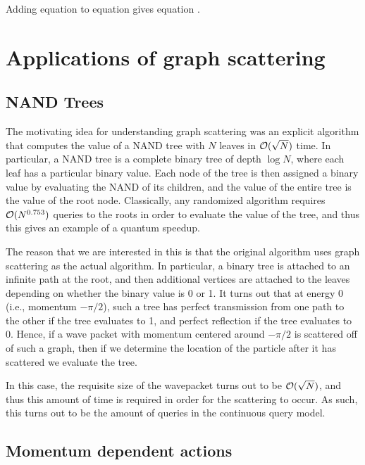 \documentclass[../thesis-main/thesis-main]{subfiles}
\begin{document}
 Adding equation  to equation  gives
equation .


\section{Applications of graph scattering}

\subsection{NAND Trees}

The motivating idea for understanding graph scattering was an explicit algorithm that computes the value of a NAND tree with $N$ leaves in $\mathcal{O}(\sqrt{N})$ time.  In particular, a NAND tree is a complete binary tree of depth $\log N$, where each leaf has a particular binary value.  Each node of the tree is then assigned a binary value by evaluating the NAND of its children, and the value of the entire tree is the value of the root node.  Classically, any randomized algorithm requires $\mathcal{O}(N^{0.753})$ queries to the roots in order to evaluate the value of the tree, and thus this gives an example of a quantum speedup.

The reason that we are interested in this is that the original algorithm uses graph scattering as the actual algorithm.  In particular, a binary tree is attached to an infinite path at the root, and then additional vertices are attached to the leaves depending on whether the binary value is 0 or 1.  It turns out that at energy 0 (i.e., momentum $-\pi/2$), such a tree has perfect transmission from one path to the other if the tree evaluates to 1, and perfect reflection if the tree evaluates to 0.  Hence, if a wave packet with momentum centered around $-\pi/2$ is scattered off of such a graph, then if we determine the location of the particle after it has scattered we evaluate the tree. 

In this case, the requisite size of the wavepacket turns out to be $\mathcal{O}(\sqrt{N})$, and thus this amount of time is required in order for the scattering to occur.  As such, this turns out to be the amount of queries in the continuous query model.

\subsection{Momentum dependent actions}
\end{document}
